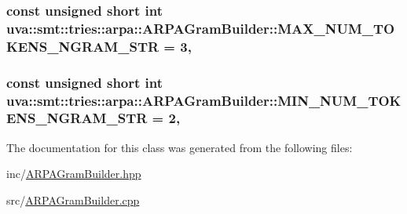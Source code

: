 \subsubsection[{M\+A\+X\+\_\+\+N\+U\+M\+\_\+\+T\+O\+K\+E\+N\+S\+\_\+\+N\+G\+R\+A\+M\+\_\+\+S\+T\+R}]{\setlength{\rightskip}{0pt plus 5cm}const unsigned short int uva\+::smt\+::tries\+::arpa\+::\+A\+R\+P\+A\+Gram\+Builder\+::\+M\+A\+X\+\_\+\+N\+U\+M\+\_\+\+T\+O\+K\+E\+N\+S\+\_\+\+N\+G\+R\+A\+M\+\_\+\+S\+T\+R = 3\hspace{0.3cm}{\ttfamily [static]}, {\ttfamily [protected]}}\label{classuva_1_1smt_1_1tries_1_1arpa_1_1_a_r_p_a_gram_builder_a45bad72450a6948351de0cfaa1339f3c}
\hypertarget{classuva_1_1smt_1_1tries_1_1arpa_1_1_a_r_p_a_gram_builder_acd62c4e16c9937a119d2beacd3b2247d}{}
\subsubsection[{M\+I\+N\+\_\+\+N\+U\+M\+\_\+\+T\+O\+K\+E\+N\+S\+\_\+\+N\+G\+R\+A\+M\+\_\+\+S\+T\+R}]{\setlength{\rightskip}{0pt plus 5cm}const unsigned short int uva\+::smt\+::tries\+::arpa\+::\+A\+R\+P\+A\+Gram\+Builder\+::\+M\+I\+N\+\_\+\+N\+U\+M\+\_\+\+T\+O\+K\+E\+N\+S\+\_\+\+N\+G\+R\+A\+M\+\_\+\+S\+T\+R = 2\hspace{0.3cm}{\ttfamily [static]}, {\ttfamily [protected]}}\label{classuva_1_1smt_1_1tries_1_1arpa_1_1_a_r_p_a_gram_builder_acd62c4e16c9937a119d2beacd3b2247d}


The documentation for this class was generated from the following files\+:\begin{DoxyCompactItemize}
\item 
inc/\hyperlink{_a_r_p_a_gram_builder_8hpp}{A\+R\+P\+A\+Gram\+Builder.\+hpp}\item 
src/\hyperlink{_a_r_p_a_gram_builder_8cpp}{A\+R\+P\+A\+Gram\+Builder.\+cpp}\end{DoxyCompactItemize}
